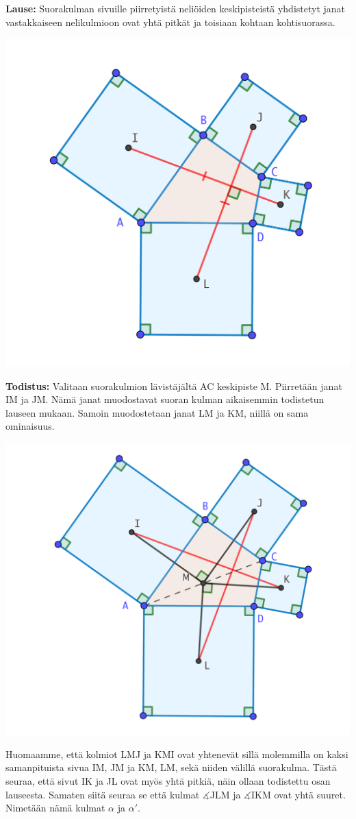 \documentclass{article}
\begin{document}
\textbf{Lause:} Suorakulman sivuille piirretyistä neliöiden keskipisteistä yhdistetyt janat vastakkaiseen nelikulmioon ovat yhtä pitkät ja toisiaan kohtaan kohtisuorassa. 
\begin{center}
    \includegraphics[scale=0.3]{todistuskuva}
\end{center}

\textbf{Todistus:} Valitaan suorakulmion lävistäjältä AC keskipiste M. Piirretään janat IM ja JM. Nämä janat muodostavat suoran kulman aikaisemmin todistetun lauseen mukaan. Samoin muodostetaan janat LM ja KM, niillä on sama ominaisuus.
\begin{center}
    \includegraphics[scale=0.3]{todistus1}
\end{center}
Huomaamme, että kolmiot LMJ ja KMI ovat yhtenevät sillä molemmilla on kaksi samanpituista sivua IM, JM ja KM, LM, sekä niiden välillä suorakulma. Tästä seuraa, että sivut IK ja JL ovat myös yhtä pitkiä, näin ollaan todistettu osan lauseesta. Samaten siitä seuraa se että kulmat $\measuredangle$JLM ja $\measuredangle$IKM ovat yhtä suuret. Nimetään nämä kulmat $\alpha$ ja $\alpha'$.
\end{document}
